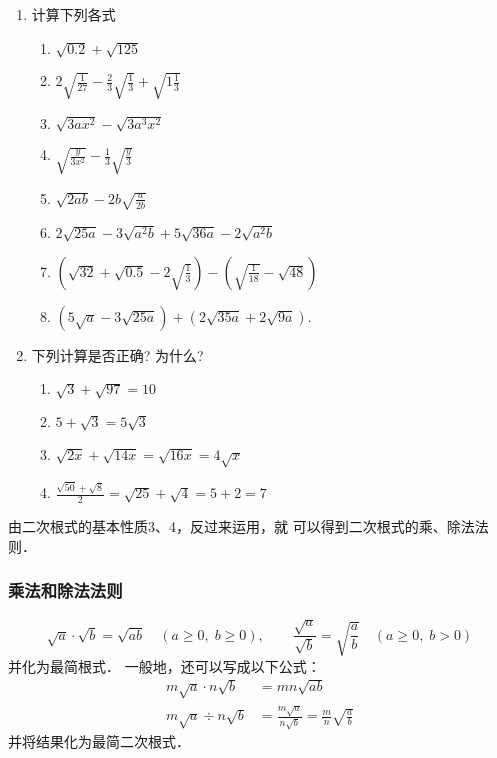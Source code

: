 \begin{ex}
\begin{enumerate}
    \item 计算下列各式
\begin{enumerate}
    \item $\sqrt{0.2}+\sqrt{125}$
    \item $2\sqrt{\frac{1}{27}}-\frac{2}{3}\sqrt{\frac{1}{3}}+\sqrt{1\frac{1}{3}}$
    \item $\sqrt{3 a x^{2}}-\sqrt{3 a^{3} x^{2}}$
    \item $\sqrt{\frac{y}{3 x^{2}}}-\frac{1}{3} \sqrt{\frac{y}{3}}$
    \item $\sqrt{2 a b}-2 b \sqrt{\frac{a}{2 b}}$
    \item $2 \sqrt{25 a}-3 \sqrt{a^{2}b}+5 \sqrt{36 a}-2 \sqrt{a^{2} b}$
    \item  $\left(\sqrt{32}+\sqrt{0.5}-2 \sqrt{\frac{1}{3}}\right)-\left(\sqrt{\frac{1}{18}}-\sqrt{48}\right)$
    \item  $(5 \sqrt{a}-3 \sqrt{25 a})+(2 \sqrt{35 a}+2 \sqrt{9 a})$.
\end{enumerate}

\item 下列计算是否正确? 为什么?
\begin{enumerate}
    \item  $\sqrt{3}+\sqrt{97}=10$
    \item $5+\sqrt{3}=5 \sqrt{3}$
    \item $\sqrt{2 x}+\sqrt{14 x}=\sqrt{16 x}=4 \sqrt{x}$
    \item $\frac{\sqrt{50}+\sqrt{8}}{2}=\sqrt{25}+\sqrt{4}=5+2=7$
\end{enumerate}
\end{enumerate}
\end{ex}

由二次根式的基本性质3、4，反过来运用，就
可以得到二次根式的乘、除法法则．

\subsubsection{乘法和除法法则}
\[\sqrt{a}\cdot \sqrt{b}=\sqrt{ab}\quad (a\ge 0,\; b\ge 0),\qquad \frac{\sqrt{a}}{\sqrt{b}}=\sqrt{\frac{a}{b}}\quad (a\ge 0,\; b>0)  \]
并化为最简根式．
一般地，还可以写成以下公式：
\[\begin{split}
    m\sqrt{a}\cdot n\sqrt{b}&= mn\sqrt{ab}\\
    m\sqrt{a}\div n\sqrt{b}&=\frac{m\sqrt{a}}{n\sqrt{b}}=\frac{m}{n}\sqrt{\frac{a}{b}}
\end{split}\]
并将结果化为最简二次根式．

